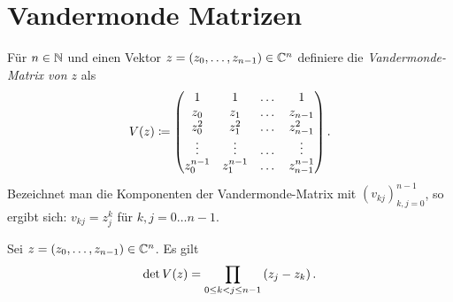 \section{Vandermonde Matrizen}
\begin{mydef}
    Für $n \in \mathbb{N}$ und einen Vektor $z = (z_0, \dots, z_{n-1}) \in \mathbb{C}^n$
    definiere die \emph{Vandermonde-Matrix von $z$} als
    \[
        \text{$V(z)$} \coloneqq \begin{pmatrix}
            1         & 1         & \dots & 1 \\
            z_0       & z_1       & \dots & z_{n-1} \\
            z_0^2     & z_1^2     & \dots & z_{n-1}^2 \\
            \vdots    & \vdots    & \dots & \vdots \\
            z_0^{n-1} & z_1^{n-1} & \dots & z_{n-1}^{n-1}
        \end{pmatrix}.
    \]
    Bezeichnet man die Komponenten der Vandermonde-Matrix mit
    $\left( v_{kj} \right)_{k,j = 0}^{n-1}$, so ergibt sich:
    $ v_{kj} = z_j^k $ für $k, j = 0 \dots n-1$.
\end{mydef}

\begin{lemma}
    Sei $z = (z_0, \dots, z_{n-1}) \in \mathbb{C}^n$.
    Es gilt
    \[
        \det \text{$V(z)$} = \prod_{0 \leq k < j \leq n-1} \left( z_j - z_k \right).
    \]
\end{lemma}

